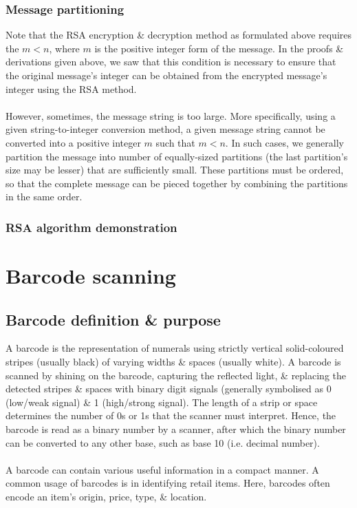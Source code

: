 \subsection{Message partitioning}
Note that the RSA encryption \& decryption method as formulated above requires the $m<n$, where $m$ is the positive integer form of the message. In the proofs \& derivations given above, we saw that this condition is necessary to ensure that the original message's integer can be obtained from the encrypted message's integer using the RSA method.
\\~\\
However, sometimes, the message string is too large. More specifically, using a given string-to-integer conversion method, a given message string cannot be converted into a positive integer $m$ such that $m<n$. In such cases, we generally partition the message into number of equally-sized partitions (the last partition's size may be lesser) that are sufficiently small. These partitions must be ordered, so that the complete message can be pieced together by combining the partitions in the same order.

\subsection{RSA algorithm demonstration} \label{rsaDemo}


\chapter{Barcode scanning}
\section{Barcode definition \& purpose}
A barcode is the representation of numerals using strictly vertical solid-coloured stripes (usually black) of varying widths \& spaces (usually white). A barcode is scanned by shining on the barcode, capturing the reflected light, \& replacing the detected stripes \& spaces with binary digit signals (generally symbolised as 0 (low/weak signal) \& 1 (high/strong signal). The length of a strip or space determines the number of 0s or 1s that the scanner must interpret. Hence, the barcode is read as a binary number by a scanner, after which the binary number can be converted to any other base, such as base 10 (i.e. decimal number).
\\~\\
 A barcode can contain various useful information in a compact manner. A common usage of barcodes is in identifying retail items. Here, barcodes often encode an item's origin, price, type, \& location.

